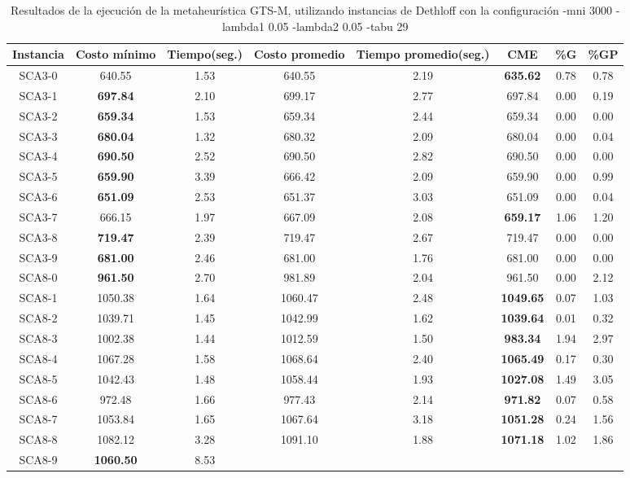 \begin{table}[h]
\caption{Resultados de la ejecución de la metaheurística GTS-M, utilizando instancias de Dethloff con la configuración -mni 3000 -lambda1 0.05 -lambda2 0.05 -tabu 29}
\centering
\small
\begin{tabular}{c c c c c c c c}
\hline\hline
Instancia & Costo mínimo & Tiempo(seg.) & Costo promedio & Tiempo promedio(seg.) & CME & \%G & \%GP \\ [0.5ex]
\hline
SCA3-0 & 640.55 & 1.53 & 
640.55 & 2.19 & \bf{635.62} & 
0.78 & 0.78\\SCA3-1 & \bf{697.84} & 2.10 & 
699.17 & 2.77 & 697.84 & 0.00
 & 0.19\\SCA3-2 & \bf{659.34} & 1.53 & 
659.34 & 2.44 & 659.34 & 0.00
 & 0.00\\
SCA3-3 & \bf{680.04} & 1.32 & 
680.32 & 2.09 & 680.04 & 0.00
 & 0.04\\SCA3-4 & \bf{690.50} & 2.52 & 
690.50 & 2.82 & 690.50 & 0.00
 & 0.00\\
SCA3-5 & \bf{659.90} & 3.39 & 
666.42 & 2.09 & 659.90 & 0.00
 & 0.99\\SCA3-6 & \bf{651.09} & 2.53 & 
651.37 & 3.03 & 651.09 & 0.00
 & 0.04\\SCA3-7 & 666.15 & 1.97 & 
667.09 & 2.08 & \bf{659.17} & 
1.06 & 1.20\\SCA3-8 & \bf{719.47} & 2.39 & 
719.47 & 2.67 & 719.47 & 0.00
 & 0.00\\
SCA3-9 & \bf{681.00} & 2.46 & 
681.00 & 1.76 & 681.00 & 0.00
 & 0.00\\
SCA8-0 & \bf{961.50} & 2.70 & 
981.89 & 2.04 & 961.50 & 0.00
 & 2.12\\SCA8-1 & 1050.38 & 1.64 & 
1060.47 & 2.48 & \bf{1049.65} & 
0.07 & 1.03\\SCA8-2 & 1039.71 & 1.45 & 
1042.99 & 1.62 & \bf{1039.64} & 
0.01 & 0.32\\SCA8-3 & 1002.38 & 1.44 & 
1012.59 & 1.50 & \bf{983.34} & 
1.94 & 2.97\\SCA8-4 & 1067.28 & 1.58 & 
1068.64 & 2.40 & \bf{1065.49} & 
0.17 & 0.30\\SCA8-5 & 1042.43 & 1.48 & 
1058.44 & 1.93 & \bf{1027.08} & 
1.49 & 3.05\\SCA8-6 & 972.48 & 1.66 & 
977.43 & 2.14 & \bf{971.82} & 
0.07 & 0.58\\SCA8-7 & 1053.84 & 1.65 & 
1067.64 & 3.18 & \bf{1051.28} & 
0.24 & 1.56\\SCA8-8 & 1082.12 & 3.28 & 
1091.10 & 1.88 & \bf{1071.18} & 
1.02 & 1.86\\SCA8-9 & \bf{1060.50} & 8.53 & 

\end{tabular}
\end{table}
